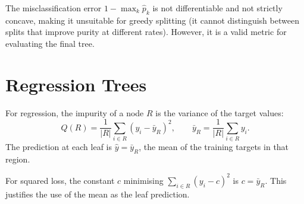 \begin{center}
\end{center}

\begin{remark}
The misclassification error $1 - \max_k \hat{p}_k$ is not differentiable and not strictly concave, making it unsuitable for greedy splitting (it cannot distinguish between splits that improve purity at different rates). However, it is a valid metric for evaluating the final tree.
\end{remark}

\section{Regression Trees}

\begin{definition}
For regression, the impurity of a node $R$ is the variance of the target values:
\[
    Q(R) = \frac{1}{|R|}\sum_{i \in R}(y_i - \bar{y}_R)^2,
    \qquad \bar{y}_R = \frac{1}{|R|}\sum_{i \in R}y_i.
\]
The prediction at each leaf is $\hat{y} = \bar{y}_R$, the mean of the training targets in that region.
\end{definition}

\begin{proposition}
For squared loss, the constant $c$ minimising $\sum_{i \in R}(y_i - c)^2$ is $c = \bar{y}_R$. This justifies the use of the mean as the leaf prediction.
\end{proposition}

